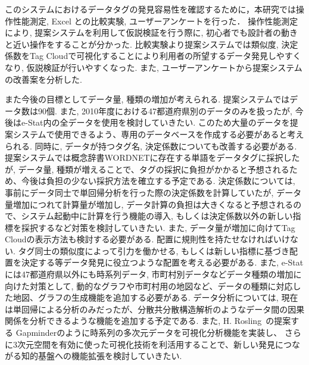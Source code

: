 \documentclass[sotsuron]{kuee}
\begin{document}
このシステムにおけるデータタグの発見容易性を確認するために，本研究では操作性能測定, Excel との比較実験, ユーザーアンケートを行った．
操作性能測定により, 提案システムを利用して仮説検証を行う際に, 初心者でも設計者の動きと近い操作をすることが分かった.
比較実験より提案システムでは類似度, 決定係数をTag Cloudで可視化することにより利用者の所望するデータ発見しやすくなり,
仮説検証が行いやすくなった. また, ユーザーアンケートから提案システムの改善案を分析した.

また今後の目標としてデータ量, 種類の増加が考えられる.
提案システムではデータ数は90個. また, 2010年度における47都道府県別のデータのみを扱ったが, 今後はe-Stat内の全データを使用を検討していきたい.
このため大量のデータを提案システムで使用できるよう、専用のデータベースを作成する必要があると考えられる.
同時に, データが持つタグ名, 決定係数についても改善する必要がある.
提案システムでは概念辞書WORDNETに存在する単語をデータタグに採択したが,
データ量, 種類が増えることで、タグの採択に負担がかかると予想されるため、今後は負担の少ない採択方法を確立する予定である.
決定係数については, 事前にデータ同士で単回帰分析を行った際の決定係数を計算していたが, データ量増加につれて計算量が増加し,
データ計算の負担は大きくなると予想されるので、システム起動中に計算を行う機能の導入,
もしくは決定係数以外の新しい指標を採択するなど対策を検討していきたい.
また, データ量が増加に向けてTag Cloudの表示方法も検討する必要がある.
配置に規則性を持たせなければいけない. タグ同士の類似度によって引力を働かせる,
もしくは新しい指標に基づき配置を決定する等データ発見に役立つような配置を考える必要がある.
また, e-Statには47都道府県以外にも時系列データ, 市町村別データなどデータ種類の増加に向けた対策として,
動的なグラフや市町村用の地図など、データの種類に対応した地図、グラフの生成機能を追加する必要がある.
データ分析については, 現在は単回帰による分析のみだったが、分散共分散構造解析のようなデータ間の因果関係を分析できるような機能を追加する予定である.
また, H. Rosling~\cite{6-1}の提案する Gapminderのように時系列の多次元データを可視化分析機能を実装し、
さらに3次元空間を有効に使った可視化技術を利活用することで、新しい発見につながる知的基盤への機能拡張を検討していきたい.
\end{document}
